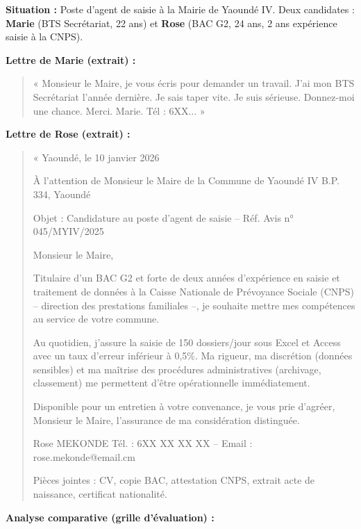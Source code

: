 \documentclass[11pt]{article}
\begin{document}
\begin{exoresolu}
\textbf{Situation :} Poste d'agent de saisie à la Mairie de Yaoundé IV. Deux candidates : \textbf{Marie} (BTS Secrétariat, 22 ans) et \textbf{Rose} (BAC G2, 24 ans, 2 ans expérience saisie à la CNPS).

\textbf{Lettre de Marie (extrait) :}
\begin{quote}
« Monsieur le Maire, je vous écris pour demander un travail. J'ai mon BTS Secrétariat l'année dernière. Je sais taper vite. Je suis sérieuse. Donnez-moi une chance. Merci. Marie. Tél : 6XX... »
\end{quote}

\textbf{Lettre de Rose (extrait) :}
\begin{quote}
« Yaoundé, le 10 janvier 2026

À l'attention de Monsieur le Maire de la Commune de Yaoundé IV
B.P. 334, Yaoundé

Objet : Candidature au poste d'agent de saisie -- Réf. Avis n° 045/MYIV/2025

Monsieur le Maire,

Titulaire d'un BAC G2 et forte de deux années d'expérience en saisie et traitement de données à la Caisse Nationale de Prévoyance Sociale (CNPS) -- direction des prestations familiales --, je souhaite mettre mes compétences au service de votre commune.

Au quotidien, j'assure la saisie de 150 dossiers/jour sous Excel et Access avec un taux d'erreur inférieur à 0,5\%. Ma rigueur, ma discrétion (données sensibles) et ma maîtrise des procédures administratives (archivage, classement) me permettent d'être opérationnelle immédiatement.

Disponible pour un entretien à votre convenance, je vous prie d'agréer, Monsieur le Maire, l'assurance de ma considération distinguée.

Rose MEKONDE
Tél. : 6XX XX XX XX -- Email : rose.mekonde@email.cm

Pièces jointes : CV, copie BAC, attestation CNPS, extrait acte de naissance, certificat nationalité.
\end{quote}
\tcblower
\textbf{Analyse comparative (grille d'évaluation) :}


\end{exoresolu}
\end{document}
